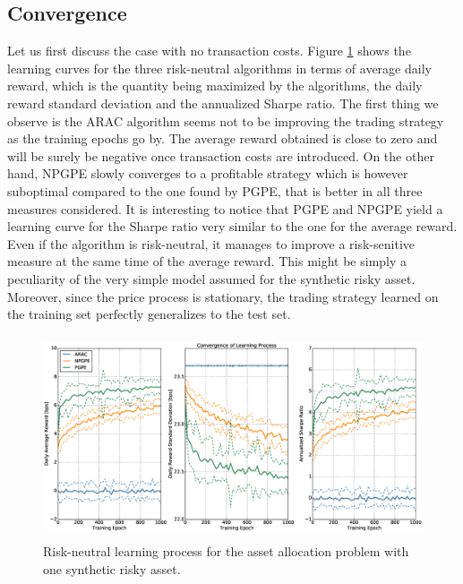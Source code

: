 \subsection{Convergence}
Let us first discuss the case with no transaction costs. Figure \ref{fig:single_synthetic_neutral_convergence} shows the learning curves for the three risk-neutral algorithms in terms of average daily reward, which is the quantity being maximized by the algorithms, the daily reward standard deviation and the annualized Sharpe ratio. The first thing we observe is the ARAC algorithm seems not to be improving the trading strategy as the training epochs go by. The average reward obtained is close to zero and will be surely be negative once transaction costs are introduced. On the other hand, NPGPE slowly converges to a profitable strategy which is however suboptimal compared to the one found by PGPE, that is better in all three measures considered. It is interesting to notice that PGPE and NPGPE yield a learning curve for the Sharpe ratio very similar to the one for the average reward. Even if the algorithm is risk-neutral, it manages to improve a risk-senitive measure at the same time of the average reward. This might be simply a peculiarity of the very simple model assumed for the synthetic risky asset. Moreover, since the price process is stationary, the trading strategy learned on the training set perfectly generalizes to the test set. 
\begin{figure}[t!]
	\centering
	\includegraphics[height=6cm,width=1.0\textwidth]{Images/6_0_single_synthetic_neutral_convergence}
	\caption[Risk-neutral learning process for one synthetic risky asset]{Risk-neutral learning process for the asset allocation problem with one synthetic risky asset.}
	\label{fig:single_synthetic_neutral_convergence}
\end{figure}

